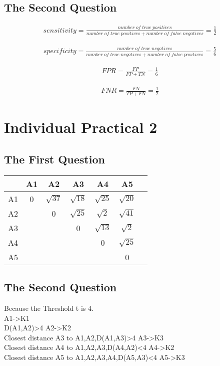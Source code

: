 \documentclass[a4pper,11pt,onecolumn]{article}
\begin{document}
\subsection{The Second Question}

\begin{equation}
\begin{aligned}
sensitivity=\frac{number\;of\; true \;positives}{number\;of\; true\; positives+number \;of\; false\; negatives}
=\frac{1}{2}
\end{aligned}
\end{equation}

\begin{equation}
\begin{aligned}
specificity=\frac{number\;of\; true \;negatives}{number\;of\; true\; negatives+number \;of\; false\; positives}=\frac{5}{6}
\end{aligned}
\end{equation}


\begin{equation}
\begin{aligned}
FPR=\frac{FP}{FP+TN}=\frac{1}{6}
\end{aligned}
\end{equation}


\begin{equation}
\begin{aligned}
FNR=\frac{FN}{TP+FN}=\frac{1}{2}
\end{aligned}
\end{equation}
\section{Individual Practical 2}
\subsection{The First Question}
\begin{table}[h]  %
	\centering  %
	
	\begin{tabular}{ccccccc}  
		\hline
		\hline
		& A1 & A2  & 
		A3& A4&A5\\ [0.5ex]  %
		\hline
		A1 & 0  & $\sqrt{37}$  &  $\sqrt{18}$  &$\sqrt{25}$&$\sqrt{20}$ \\
		A2 &  & 0  & $\sqrt{25}$ &$\sqrt{2}$&$\sqrt{41}$ \\
		A3 &   &   & 0 &$\sqrt{13}$&$\sqrt{2}$ \\
		A4 &  &  &  &0&$\sqrt{25}$ \\
		A5 &  &  &   & &0\\
		
		\hline
		
		\hline
	\end{tabular}
\end{table}
\subsection{The Second Question}
Because the Threshold t is 4.\\
A1->K1\\
D(A1,A2)>4 A2->K2\\
Closest distance A3 to A1,A2,D(A1,A3)>4 A3->K3\\
Closest distance A4 to A1,A2,A3,D(A4,A2)<4 A4->K2\\
Closest distance A5 to A1,A2,A3,A4,D(A5,A3)<4 A5->K3\\
\end{document}
